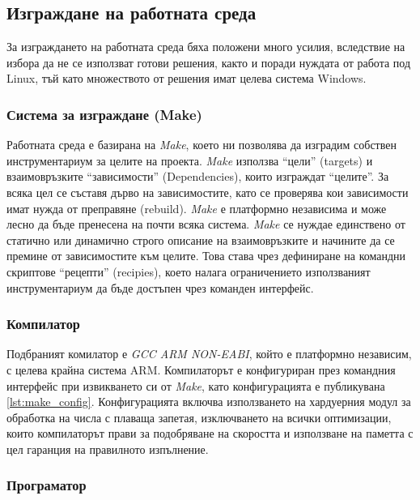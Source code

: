 \subsection{Изграждане на работната среда}

За изграждането на работната среда бяха положени много усилия, вследствие на избора да не се използват готови решения,
както и поради нуждата от работа под Linux, тъй като множеството от решения имат целева система Windows.

\subsubsection{Система за изграждане (Make)}

Работната среда е базирана на \textit{Make}, което ни позволява да изградим собствен инструментариум за целите на проекта.
\textit{Make} използва \enquote{цели} (targets) и взаимовръзките \enquote{зависимости} (Dependencies), които изграждат \enquote{целите}. 
За всяка цел се съставя дърво
на зависимостите, като се проверява
кои зависимости имат нужда от преправяне (rebuild). \textit{Make} е платформно независима и може лесно да бъде пренесена на почти всяка система.
\textit{Make} се нуждае единствено от статично или динамично строго описание на взаимовръзките и начините да се
премине от зависимостите към целите. Това става чрез дефиниране на командни скриптове \enquote{рецепти} (recipies), 
което налага ограничението използваният инструментариум да бъде достъпен чрез команден интерфейс.

\subsubsection{Компилатор}

Подбраният комилатор е \textit{GCC ARM NON-EABI}, който е платформно независим, с целева крайна система ARM.
Компилаторът е конфигуриран през командния интерфейс при извикването си от \textit{Make},
като конфигурацията е публикувана \autoref{lst:make_config}.
Конфигурацията включва използването на хардуерния модул за обработка на числа с плаваща запетая,
изключването на всички оптимизации, които компилаторът прави за подобряване на скоростта и използване на паметта с цел гаранция на правилното изпълнение.

\subsubsection{Програматор}


